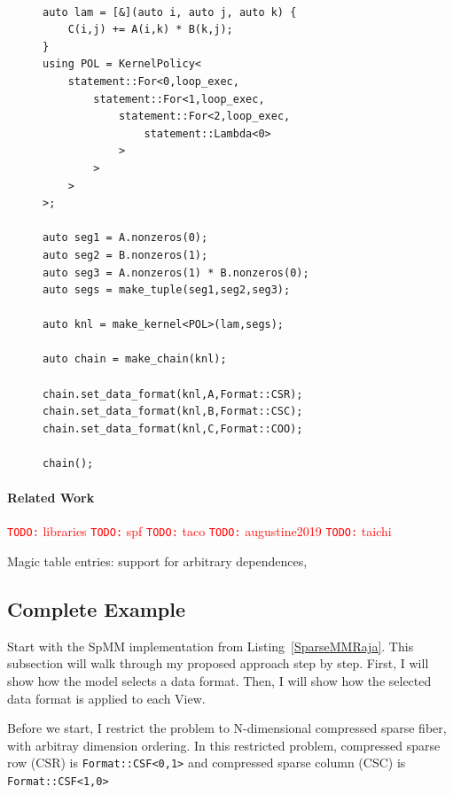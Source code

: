 \documentclass{article}
\newcommand{\todo}[1]{{\textcolor{red}{{\tt{TODO:}}\,\,#1 }}}
\begin{document}
\begin{figure}
\begin{lstlisting}[caption={Possible RAJA implementation of Sparse Matrix Multiply.}, label={SparseMMRaja}]
    
auto lam = [&](auto i, auto j, auto k) {
    C(i,j) += A(i,k) * B(k,j);
}
using POL = KernelPolicy<
    statement::For<0,loop_exec,
        statement::For<1,loop_exec,
            statement::For<2,loop_exec,
                statement::Lambda<0>
            >
        >
    >
>;

auto seg1 = A.nonzeros(0);
auto seg2 = B.nonzeros(1);
auto seg3 = A.nonzeros(1) * B.nonzeros(0);
auto segs = make_tuple(seg1,seg2,seg3);

auto knl = make_kernel<POL>(lam,segs);

auto chain = make_chain(knl);

chain.set_data_format(knl,A,Format::CSR);
chain.set_data_format(knl,B,Format::CSC);
chain.set_data_format(knl,C,Format::COO);

chain();

\end{lstlisting}
\end{figure}








\paragraph{Related Work}

\todo{libraries}
\todo{spf}
\todo{taco}
\todo{augustine2019}
\todo{taichi}


Magic table entries: support for arbitrary dependences, 

\subsection{Complete Example}

Start with the SpMM implementation from Listing~\ref{SparseMMRaja}.
This subsection will walk through my proposed approach step by step.
First, I will show how the model selects a data format. 
Then, I will show how the selected data format is applied to each View.

Before we start, I restrict the problem to N-dimensional compressed sparse fiber, with arbitray dimension ordering. 
In this restricted problem, compressed sparse row (CSR) is \verb.Format::CSF<0,1>. and compressed sparse column (CSC) is  \verb.Format::CSF<1,0>.
\end{document}

